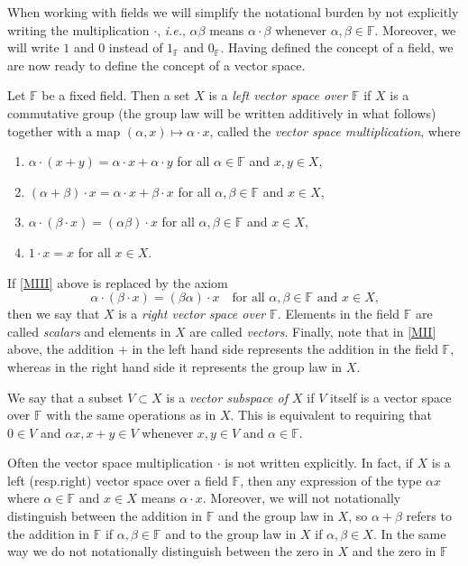 \documentclass[a4paper]{paper}
\newcommand{\Field}{\mathbb{F}}
\newcommand{\ie}{\textsl{i.e.}\xspace}
\begin{document}
When working with fields we will simplify the notational burden by not explicitly writing 
the multiplication $\cdot$, \ie, $\alpha \beta$ means $\alpha\cdot\beta$ whenever 
$\alpha,\beta\in\Field$. Moreover, we will write $1$ and $0$ instead of $1_{\Field}$ and $0_{\Field}$.
Having defined the concept of a field, we are now ready to define the concept of a vector 
space.
\begin{definition}
  Let $\Field$ be a fixed field. Then a set $X$ is a \emph{left vector space over $\Field$} if 
  $X$ is a commutative group (the group law will be written additively in what follows)
  together with a map  $(\alpha,x) \mapsto \alpha\cdot x$, called the \emph{vector space 
  multiplication}, where
  \begin{enumerate}
  \item $\alpha \cdot (x+y)=\alpha \cdot x+\alpha \cdot y$
     for all $\alpha\in \Field$ and $x,y\in X$,
  \item $(\alpha + \beta) \cdot x= \alpha \cdot x + \beta\cdot x$ 
     for all $\alpha, \beta\in \Field$ and $x\in X$,\label{MII}
  \item $\alpha \cdot (\beta \cdot x) = (\alpha\beta)\cdot x$  
     for all $\alpha, \beta\in \Field$ and $x\in X$,\label{MIII}
  \item $1\cdot x = x$ for all $x\in X$.
  \end{enumerate}
  If \eqref{MIII} above is replaced by the axiom
  \[ \alpha \cdot (\beta \cdot x) = (\beta \alpha)\cdot x
        \quad\text{for all $\alpha, \beta\in \Field$ and $x\in X$,}
  \]
  then we say that $X$ is a \emph{right vector space over $\Field$}. Elements in the 
  field $\Field$ are called \emph{scalars} and elements in $X$ are called \emph{vectors}. 
  Finally,  note that in \eqref{MII} above, the addition $+$ in the left hand side 
  represents the addition in 
  the field $\Field$, whereas in the right hand side it represents the group law in $X$.
\end{definition}  
We say that a subset $V \subset X$ is a \emph{vector subspace of $X$} if $V$ itself is a vector 
space over $\Field$ with the same operations as in $X$. This is equivalent to requiring that 
$0\in V$ and $\alpha x, x+y \in V$ whenever $x,y\in V$ and $\alpha \in \Field$.

Often the vector space multiplication $\cdot$ is not written explicitly. In fact, if $X$ is a 
left (resp.\@ right) vector space over a field $\Field$, then any expression of the type 
$\alpha x$ where $\alpha\in\Field$ and $x\in X$ means $\alpha \cdot x$. Moreover, we will not 
notationally distinguish between the addition in $\Field$ and the group law in $X$, so 
$\alpha + \beta$ refers to the addition in $\Field$ if $\alpha,\beta\in \Field$ and to the group law in 
$X$ if $\alpha,\beta\in X$. In the same way we do not notationally distinguish between the 
zero in $X$ and the zero in $\Field$
\end{document}
